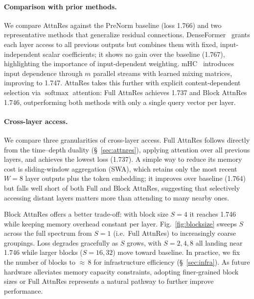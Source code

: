 \paragraph{Comparison with prior methods.}
We compare AttnRes against the PreNorm baseline (loss 1.766) and two representative methods that generalize residual connections. DenseFormer~\cite{pagliardini2024denseformer} grants each layer access to all previous outputs but combines them with fixed, input-independent scalar coefficients; it shows no gain over the baseline (1.767), highlighting the importance of input-dependent weighting. mHC~\cite{xie2026mhc} introduces input dependence through $m$ parallel streams with learned mixing matrices, improving to 1.747. AttnRes takes this further with explicit content-dependent selection via $\operatorname{softmax}$ attention: Full AttnRes achieves 1.737 and Block AttnRes 1.746, outperforming both methods with only a single query vector per layer.

\paragraph{Cross-layer access.}
We compare three granularities of cross-layer access. Full AttnRes follows directly from the time--depth duality (\S~\ref{sec:attnres}), applying attention over all previous layers, and achieves the lowest loss (1.737). A simple way to reduce its memory cost is sliding-window aggregation (SWA), which retains only the most recent $W{=}8$ layer outputs plus the token embedding; it improves over baseline (1.764) but falls well short of both Full and Block AttnRes, suggesting that selectively accessing distant layers matters more than attending to many nearby ones.

Block AttnRes offers a better trade-off: with block size $S{=}4$ it reaches 1.746 while keeping memory overhead constant per layer. Fig.~\ref{fig:blocksize} sweeps $S$ across the full spectrum from $S{=}1$ (i.e.\ Full AttnRes) to increasingly coarse groupings. Loss degrades gracefully as $S$ grows, with $S{=}2, 4, 8$ all landing near 1.746 while larger blocks ($S{=}16, 32$) move toward baseline. In practice, we fix the number of blocks to ${\approx}\,8$ for infrastructure efficiency (\S~\ref{sec:infra}). As future hardware alleviates memory capacity constraints, adopting finer-grained block sizes or Full AttnRes represents a natural pathway to further improve performance.

